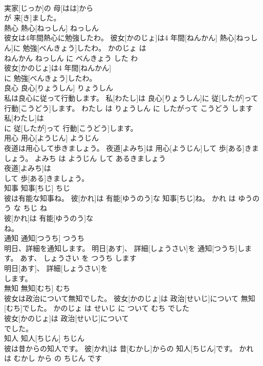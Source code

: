 \documentclass[8pt]{extreport}
\begin{document}
\begin{CJK}{UTF8}{min}
\\	実家[じっか]の 母[はは]から
\\	が 来[き]ました。			
\\	熱心	熱心[ねっしん]	ねっしん	
\\	彼女は4年間熱心に勉強したわ。	彼女[かのじょ]は4 年間[ねんかん] 熱心[ねっしん]に 勉強[べんきょう]したわ。	かのじょ は 
\\	ねんかん ねっしん に べんきょう した わ	
\\	彼女[かのじょ]は4 年間[ねんかん]
\\	に 勉強[べんきょう]したわ。			
\\	良心	良心[りょうしん]	りょうしん	
\\	私は良心に従って行動します。	私[わたし]は 良心[りょうしん]に 従[したが]って 行動[こうどう]します。	わたし は りょうしん に したがって こうどう します	
\\	私[わたし]は
\\	に 従[したが]って 行動[こうどう]します。			
\\	用心	用心[ようじん]	ようじん	
\\	夜道は用心して歩きましょう。	夜道[よみち]は 用心[ようじん]して 歩[ある]きましょう。	よみち は ようじん して あるきましょう	
\\	夜道[よみち]は
\\	して 歩[ある]きましょう。			
\\	知事	知事[ちじ]	ちじ	
\\	彼は有能な知事ね。	彼[かれ]は 有能[ゆうのう]な 知事[ちじ]ね。	かれ は ゆうのう な ちじ ね	
\\	彼[かれ]は 有能[ゆうのう]な
\\	ね。			
\\	通知	通知[つうち]	つうち	
\\	明日、詳細を通知します。	明日[あす]、 詳細[しょうさい]を 通知[つうち]します。	あす、 しょうさい を つうち します	
\\	明日[あす]、 詳細[しょうさい]を
\\	します。			
\\	無知	無知[むち]	むち	
\\	彼女は政治について無知でした。	彼女[かのじょ]は 政治[せいじ]について 無知[むち]でした。	かのじょ は せいじ に ついて むち でした	
\\	彼女[かのじょ]は 政治[せいじ]について
\\	でした。			
\\	知人	知人[ちじん]	ちじん	
\\	彼は昔からの知人です。	彼[かれ]は 昔[むかし]からの 知人[ちじん]です。	かれ は むかし から の ちじん です	

\end{CJK}
\end{document}
